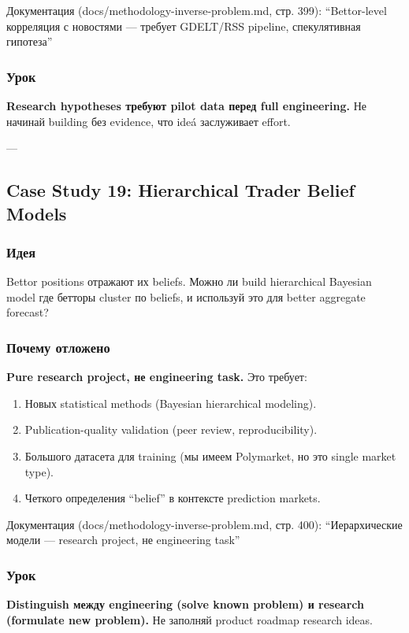 Документация (docs/methodology-inverse-problem.md, стр. 399): ``Bettor-level корреляция с новостями --- требует GDELT/RSS pipeline, спекулятивная гипотеза''

\subsubsection*{Урок}
\textbf{Research hypotheses требуют pilot data перед full engineering.} Не начинай building без evidence, что ideá заслуживает effort.

---

\subsection{Case Study 19: Hierarchical Trader Belief Models}

\subsubsection*{Идея}
Bettor positions отражают их beliefs. Можно ли build hierarchical Bayesian model где бетторы cluster по beliefs, и используй это для better aggregate forecast?

\subsubsection*{Почему отложено}
\textbf{Pure research project, не engineering task.} Это требует:
\begin{enumerate}
\item Новых statistical methods (Bayesian hierarchical modeling).
\item Publication-quality validation (peer review, reproducibility).
\item Большого датасета для training (мы имеем Polymarket, но это single market type).
\item Четкого определения ``belief'' в контексте prediction markets.
\end{enumerate}

Документация (docs/methodology-inverse-problem.md, стр. 400): ``Иерархические модели --- research project, не engineering task''

\subsubsection*{Урок}
\textbf{Distinguish между engineering (solve known problem) и research (formulate new problem).} Не заполняй product roadmap research ideas.

